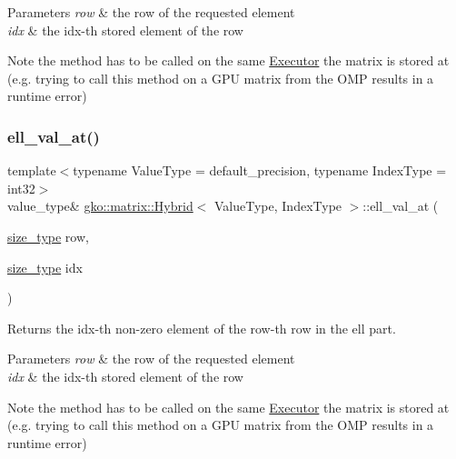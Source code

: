 \begin{DoxyParams}{Parameters}
{\em row} & the row of the requested element \\
\hline
{\em idx} & the idx-\/th stored element of the row\\
\hline
\end{DoxyParams}
\begin{DoxyNote}{Note}
the method has to be called on the same \hyperlink{classgko_1_1Executor}{Executor} the matrix is stored at (e.\+g. trying to call this method on a G\+PU matrix from the O\+MP results in a runtime error) 
\end{DoxyNote}
\mbox{\label{classgko_1_1matrix_1_1Hybrid_a5a0b57a9285424720218ff03dad6846c}} 
\subsubsection{\texorpdfstring{ell\+\_\+val\+\_\+at()}{ell\_val\_at()}\hspace{0.1cm}{\footnotesize\ttfamily [1/2]}}
{\footnotesize\ttfamily template$<$typename Value\+Type = default\+\_\+precision, typename Index\+Type = int32$>$ \\
value\+\_\+type\& \hyperlink{classgko_1_1matrix_1_1Hybrid}{gko\+::matrix\+::\+Hybrid}$<$ Value\+Type, Index\+Type $>$\+::ell\+\_\+val\+\_\+at (\begin{DoxyParamCaption}\item[{\hyperlink{namespacegko_a6e5c95df0ae4e47aab2f604a22d98ee7}{size\+\_\+type}}]{row,  }\item[{\hyperlink{namespacegko_a6e5c95df0ae4e47aab2f604a22d98ee7}{size\+\_\+type}}]{idx }\end{DoxyParamCaption})\hspace{0.3cm}{\ttfamily [noexcept]}}



Returns the {\ttfamily idx}-\/th non-\/zero element of the {\ttfamily row}-\/th row in the ell part. 


\begin{DoxyParams}{Parameters}
{\em row} & the row of the requested element \\
\hline
{\em idx} & the idx-\/th stored element of the row\\
\hline
\end{DoxyParams}
\begin{DoxyNote}{Note}
the method has to be called on the same \hyperlink{classgko_1_1Executor}{Executor} the matrix is stored at (e.\+g. trying to call this method on a G\+PU matrix from the O\+MP results in a runtime error) 
\end{DoxyNote}
\mbox{\label{classgko_1_1matrix_1_1Hybrid_a3e0ab990e82db430d0e05fe165a11620}} 
